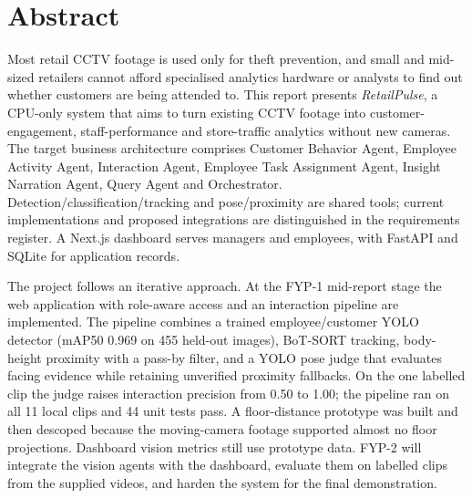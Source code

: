 \chapter*{Abstract}
Most retail CCTV footage is used only for theft prevention, and small and mid-sized retailers cannot afford specialised analytics hardware or analysts to find out whether customers are being attended to. This report presents \textit{RetailPulse}, a CPU-only system that aims to turn existing CCTV footage into customer-engagement, staff-performance and store-traffic analytics without new cameras. The target business architecture comprises Customer Behavior Agent, Employee Activity Agent, Interaction Agent, Employee Task Assignment Agent, Insight Narration Agent, Query Agent and Orchestrator. Detection/classification/tracking and pose/proximity are shared tools; current implementations and proposed integrations are distinguished in the requirements register. A Next.js dashboard serves managers and employees, with FastAPI and SQLite for application records.

The project follows an iterative approach. At the FYP-1 mid-report stage the web application with role-aware access and an interaction pipeline are implemented. The pipeline combines a trained employee/customer YOLO detector (mAP50 0.969 on 455 held-out images), BoT-SORT tracking, body-height proximity with a pass-by filter, and a YOLO pose judge that evaluates facing evidence while retaining unverified proximity fallbacks. On the one labelled clip the judge raises interaction precision from 0.50 to 1.00; the pipeline ran on all 11 local clips and 44 unit tests pass. A floor-distance prototype was built and then descoped because the moving-camera footage supported almost no floor projections. Dashboard vision metrics still use prototype data. FYP-2 will integrate the vision agents with the dashboard, evaluate them on labelled clips from the supplied videos, and harden the system for the final demonstration.

